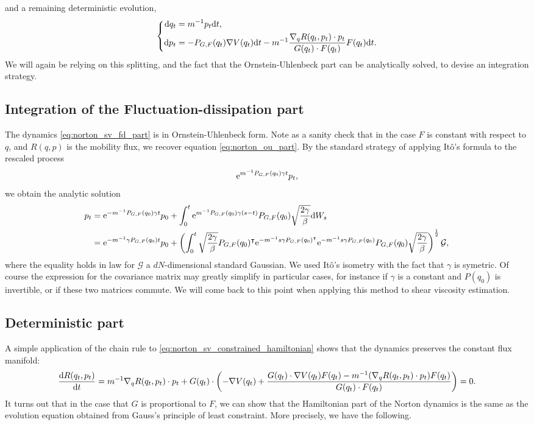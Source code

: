 and a remaining deterministic evolution,
\begin{equation}
    \label{eq:norton_sv_constrained_hamiltonian}
    \left\{
        \begin{aligned}
            \mathrm{d} q_t &= m^{-1}p_t\mathrm{d} t,\\
            \mathrm{d} p_t &= -P_{G,F}(q_t)\nabla V(q_t)\mathrm{d} t -m^{-1}\frac{\nabla_q R(q_t,p_t)\cdot p_t}{G(q_t)\cdot F(q_t)}F(q_t)\mathrm{d} t.\\
        \end{aligned}
    \right.
\end{equation}
We will again be relying on this splitting, and the fact that the Ornstein-Uhlenbeck part can be analytically solved, to devise an integration strategy.
\subsection{Integration of the Fluctuation-dissipation part}
The dynamics \eqref{eq:norton_sv_fd_part} is in Ornstein-Uhlenbeck form. Note as a sanity check that in the case $F$ is constant with respect to $q$, and $R(q,p)$ is the mobility flux, we recover equation \eqref{eq:norton_ou_part}.
By the standard strategy of applying Itô's formula to the rescaled process
\[\mathrm{e}^{m^{-1}P_{G,F}(q_0)\gamma t}p_t,\]
we obtain the analytic solution 
\begin{equation}
    \label{eq:norton_sv_fd_part_solved}
    \begin{aligned}
        p_t&=\mathrm{e}^{-m^{-1}P_{G,F}(q_0)\gamma t}p_0+\int_0^t \mathrm{e}^{m^{-1}P_{G,F}(q_0)\gamma (s-t)}P_{G,F}(q_0)\sqrt{\frac{2\gamma}{\beta}}\mathrm{d} W_s\\
        &=\mathrm{e}^{-m^{-1}\gamma P_{G,F}(q_0)t}p_0+\left(\int_0^t\sqrt{\frac{2\gamma}{\beta}}P_{G,F}(q_0)^\intercal\mathrm{e}^{-m^{-1}s\gamma P_{G,F}(q_0)^\intercal}\mathrm{e}^{-m^{-1}s\gamma P_{G,F}(q_0)}P_{G,F}(q_0)\sqrt{\frac{2\gamma}{\beta}}\right)^{\frac12}\mathcal{G},
    \end{aligned}
\end{equation}
where the equality holds in law for $\mathcal{G}$ a $dN$-dimensional standard Gaussian. We used Itô's isometry with the fact that $\gamma$ is symetric. Of course the expression for the covariance matrix may greatly simplify in particular cases, for instance if $\gamma$ is a constant and $P(q_0)$ is invertible, or if these two matrices commute.
We will come back to this point when applying this method to shear viscosity estimation.
\subsection{Deterministic part}
A simple application of the chain rule to \eqref{eq:norton_sv_constrained_hamiltonian} shows that the dynamics preserves the constant flux manifold:
\[\frac{\mathrm{d} R(q_t,p_t)}{\mathrm{d} t}=m^{-1}\nabla_q R(q_t,p_t)\cdot p_t+G(q_t)\cdot\left(-\nabla V(q_t)+\frac{G(q_t)\cdot \nabla V(q_t)F(q_t)-m^{-1}(\nabla_q R(q_t,p_t)\cdot p_t)F(q_t)}{G(q_t)\cdot F(q_t)}\right)=0.\]
It turns out that in the case that $G$ is proportional to $F$, we can show that the Hamiltonian part of the Norton dynamics is the same as the evolution equation obtained from Gauss's principle of least constraint.
More precisely, we have the following.


